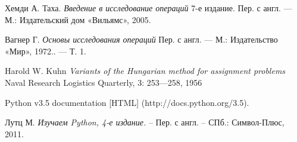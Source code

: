 \begin{thebibliography}{00}
 Хемди А. Таха.
\emph{Введение в исследование операций} 7-е издание. Пер. с англ. — М.: Издательский дом «Вильямс», 2005.

 Вагнер Г.
\emph{Основы исследования операций} Пер. с англ. — М.: Издательство «Мир», 1972.. — Т. 1.

 Harold W. Kuhn
\emph{Variants of the Hungarian method for assignment problems} Naval Research Logistics Quarterly, 3: 253—258, 1956

 Python v3.5 documentation
[HTML] (http://docs.python.org/3.5).

 Лутц М.
\emph{Изучаем Python, 4-е издание.} – Пер. с англ. – СПб.: Символ-Плюс, 2011.


\end{thebibliography}